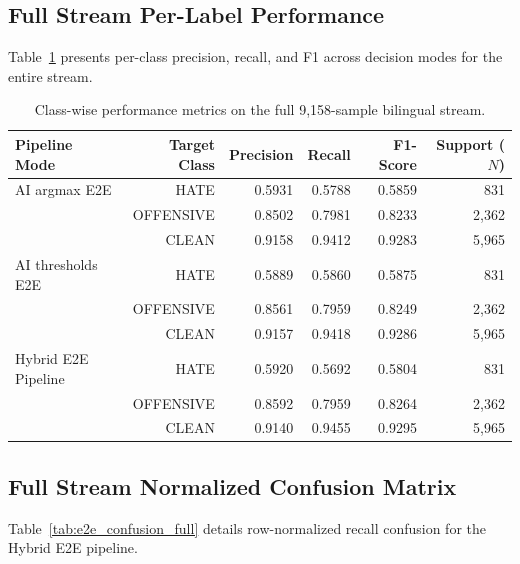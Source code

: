 \documentclass[runningheads]{llncs}
\begin{document}
\subsection{Full Stream Per-Label Performance}
Table~\ref{tab:e2e_per_label_full} presents per-class precision, recall, and F1 across decision modes for the entire stream.

\begin{table}[H]
\centering
\caption{Class-wise performance metrics on the full 9,158-sample bilingual stream.}
\label{tab:e2e_per_label_full}
\small
\begin{tabular}{lrrrrr}
\toprule
Pipeline Mode & Target Class & Precision & Recall & F1-Score & Support ($N$) \\
\midrule
AI argmax E2E & HATE & 0.5931 & 0.5788 & 0.5859 & 831 \\
 & OFFENSIVE & 0.8502 & 0.7981 & 0.8233 & 2,362 \\
 & CLEAN & 0.9158 & 0.9412 & 0.9283 & 5,965 \\
\midrule
AI thresholds E2E & HATE & 0.5889 & 0.5860 & 0.5875 & 831 \\
 & OFFENSIVE & 0.8561 & 0.7959 & 0.8249 & 2,362 \\
 & CLEAN & 0.9157 & 0.9418 & 0.9286 & 5,965 \\
\midrule
Hybrid E2E Pipeline & HATE & 0.5920 & 0.5692 & 0.5804 & 831 \\
 & OFFENSIVE & 0.8592 & 0.7959 & 0.8264 & 2,362 \\
 & CLEAN & 0.9140 & 0.9455 & 0.9295 & 5,965 \\
\bottomrule
\end{tabular}
\end{table}

\subsection{Full Stream Normalized Confusion Matrix}
Table~\ref{tab:e2e_confusion_full} details row-normalized recall confusion for the Hybrid E2E pipeline.

\begin{table}[H]
\centering
\caption{Normalized confusion matrix (row recall) for Hybrid E2E on 9,158 samples. Rows: Actual; Cols: Predicted.}
\label{tab:e2e_confusion_full}
\scriptsize
\setlength{\tabcolsep}{2pt}
\end{table}
\end{document}
